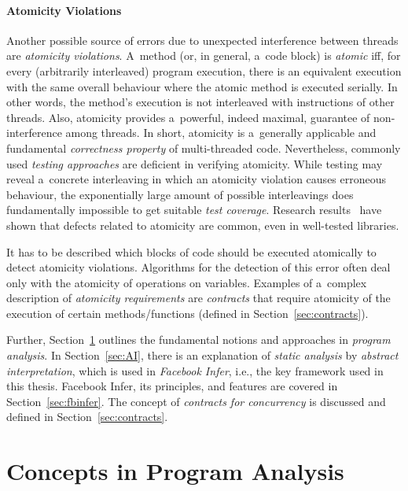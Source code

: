 \paragraph{Atomicity Violations~\cite{atomizer}}
Another possible source of errors due to unexpected interference between threads are \emph{atomicity violations}. A~method (or, in general, a~code block) is \emph{atomic} iff, for every (arbitrarily interleaved) program execution, there is an equivalent execution with the same overall behaviour where the atomic method is executed serially. In other words, the method's execution is not interleaved with instructions of other threads. Also, atomicity provides a~powerful, indeed maximal, guarantee of non-interference among threads. In short, atomicity is a~generally applicable and fundamental \emph{correctness property} of multi-threaded code. Nevertheless, commonly used \emph{testing approaches} are deficient in verifying atomicity. While testing may reveal a~concrete interleaving in which an atomicity violation causes erroneous behaviour, the exponentially large amount of possible interleavings does fundamentally impossible to get suitable \emph{test coverage}. Research results~\cite{contracts2017, atomizer, contracts2015, atomicityOOP} have shown that defects related to atomicity are common, even in well-tested libraries.

It has to be described which blocks of code should be executed atomically to detect atomicity violations. Algorithms for the detection of this error often deal only with the atomicity of operations on variables. Examples of a~complex description of \emph{atomicity requirements} are \emph{contracts} that require atomicity of the execution of certain methods/functions (defined in Section~\ref{sec:contracts}).~\cite{muzikovskaBP}

Further, Section~\ref{sec:programAnalysis} outlines the fundamental notions and approaches in \emph{program analysis}. In Section~\ref{sec:AI}, there is an explanation of \emph{static analysis} by \emph{abstract interpretation}, which is used in \emph{Facebook Infer}, i.e., the key framework used in this thesis. Facebook Infer, its principles, and features are covered in Section~\ref{sec:fbinfer}. The concept of \emph{contracts for concurrency} is discussed and defined in Section~\ref{sec:contracts}.


\section{Concepts in Program Analysis}
\label{sec:programAnalysis}

